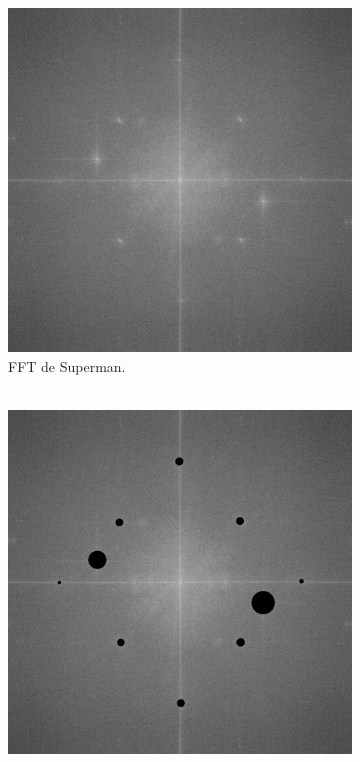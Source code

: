 \documentclass[letterpaper,12pt]{article}
\theoremstyle{plain}
\begin{document}
\begin{figure}[h]
    \centering
         \begin{subfigure}[h]{0.49\linewidth}
            \centering
            \includegraphics[width=\textwidth]{Figuras/FFT of superman.png}
            \caption{FFT de Superman. \\
            $~$} 
         \end{subfigure}
         \begin{subfigure}[h]{0.49\linewidth}
            \centering
            \includegraphics[width=\textwidth]{Figuras/FFT of superman_process.png}

\end{subfigure}
\end{figure}
\end{document}
